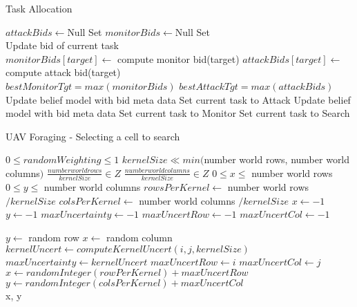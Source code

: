 \begin{algorithm}[H]
	\caption{Task Allocation}
	\label{alg:taskAlloc}
	\begin{algorithmic}[1]
		\State $attackBids \gets $Null Set
		\State $monitorBids \gets $Null Set
		\\
			\State Update bid of current task
		\EndIf
		\\
			\State $monitorBids[target] \gets$ compute monitor bid(target)
				\State $attackBids[target] \gets$ compute attack bid(target)
			\EndIf
		\EndFor
		\\
		\State $bestMonitorTgt = max(monitorBids)$
		\State $bestAttackTgt = max(attackBids)$
		\\
			\State Update belief model with bid meta data
			\State Set current task to Attack
			\State Update belief model with bid meta data		
			\State Set current task to Monitor			
		\Else
			\State Set current task to Search
		\EndIf
		
	\end{algorithmic}
\end{algorithm}

\begin{algorithm}[H]
	\caption{UAV Foraging - Selecting a cell to search}
	\label{alg:forage}
	\begin{algorithmic}[1]
		\Require $ 0\le randomWeighting \le 1$
		\Require $ kernelSize \ll min($number world rows, number world columns$)$
		\Require $ \frac{number world rows}{kernelSize} \in Z$
		\Require $ \frac{number world columns}{kernelSize} \in Z$
		\Ensure $ 0 \le x \le $ number world rows
		\Ensure $ 0 \le y \le $ number world columns
		\State $rowsPerKernel\gets $ number world rows $ / kernelSize$
		\State $colsPerKernel\gets $ number world columns $ / kernelSize$		
		\State $x\gets -1$
		\State $y\gets -1$
		\State $maxUncertainty\gets -1$
		\State $maxUncertRow\gets -1$
		\State $maxUncertCol\gets -1$
		
		
		\State $ y\gets $ random row
		\State $ x\gets $ random column
		\Else
		\State $kernelUncert\gets computeKernelUncert(i,j, kernelSize)$
		\State $maxUncertainty\gets kernelUncert$
		\State $maxUncertRow\gets i$
		\State $maxUncertCol\gets j$	
		\EndIf
		\EndFor
		\EndFor
		\State $x\gets randomInteger(rowPerKernel) + maxUncertRow$			
		\State $y\gets randomInteger(colsPerKernel) + maxUncertCol$
		\EndIf \\
		
		\Return x, y
		\EndFunction
	\end{algorithmic}
\end{algorithm}


